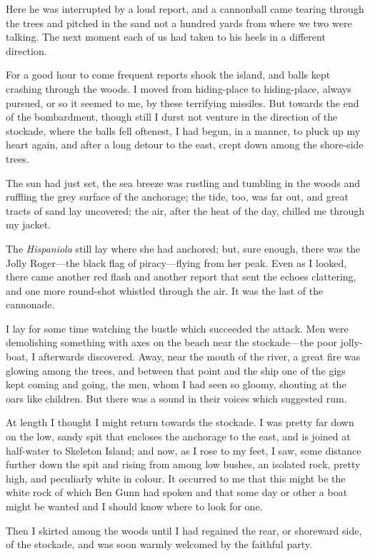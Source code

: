 Here he was interrupted by a loud report, and a cannonball came tearing through the trees and pitched in the sand not a hundred yards from where we two were talking. The next moment each of us had taken to his heels in a different direction.

For a good hour to come frequent reports shook the island, and balls kept crashing through the woods. I moved from hiding-place to hiding-place, always pursued, or so it seemed to me, by these terrifying missiles. But towards the end of the bombardment, though still I durst not venture in the direction of the stockade, where the balls fell oftenest, I had begun, in a manner, to pluck up my heart again, and after a long detour to the east, crept down among the shore-side trees.

The sun had just set, the sea breeze was rustling and tumbling in the woods and ruffling the grey surface of the anchorage; the tide, too, was far out, and great tracts of sand lay uncovered; the air, after the heat of the day, chilled me through my jacket.

The \textit{Hispaniola} still lay where she had anchored; but, sure enough, there was the Jolly Roger—the black flag of piracy—flying from her peak. Even as I looked, there came another red flash and another report that sent the echoes clattering, and one more round-shot whistled through the air. It was the last of the cannonade.

I lay for some time watching the bustle which succeeded the attack. Men were demolishing something with axes on the beach near the stockade—the poor jolly-boat, I afterwards discovered. Away, near the mouth of the river, a great fire was glowing among the trees, and between that point and the ship one of the gigs kept coming and going, the men, whom I had seen so gloomy, shouting at the oars like children. But there was a sound in their voices which suggested rum.

At length I thought I might return towards the stockade. I was pretty far down on the low, sandy spit that encloses the anchorage to the east, and is joined at half-water to Skeleton Island; and now, as I rose to my feet, I saw, some distance further down the spit and rising from among low bushes, an isolated rock, pretty high, and peculiarly white in colour. It occurred to me that this might be the white rock of which Ben Gunn had spoken and that some day or other a boat might be wanted and I should know where to look for one.

Then I skirted among the woods until I had regained the rear, or shoreward side, of the stockade, and was soon warmly welcomed by the faithful party.

